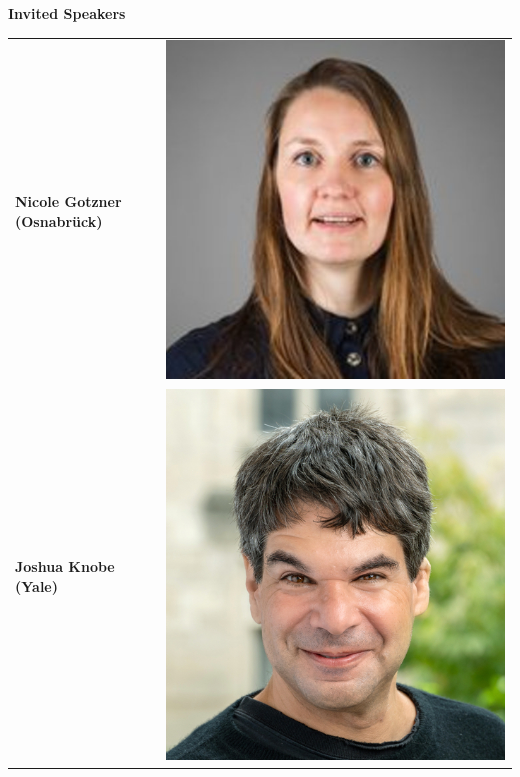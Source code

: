 \documentclass[a4paper,12pt]{article}
\begin{document}
\begin{tcolorbox}%
\begin{center}
\begin{minipage}{0.9\textwidth} %
\Large

\begin{center}
    {\huge \color{Dandelion} \textbf{Invited Speakers}}
\end{center}

\vspace{1em}
\setlength{\tabcolsep}{2pt}


\begin{tabular}{@{}>{\raggedleft\arraybackslash}m{0.3\linewidth}@{}>{\centering\arraybackslash}m{0.7\linewidth}@{}}

    \color{Blue}\textbf{Nicole Gotzner (Osnabrück)} & 
    \includegraphics[width=0.33\linewidth]{../images/nicole.png} \\[1em]
    
    \color{Blue}\textbf{Joshua Knobe (Yale)} & 
    \includegraphics[width=0.33\linewidth]{../images/joshua.jpg} \\[1em]
    

\end{tabular}
\end{minipage}
\end{center}
\end{tcolorbox}
\end{document}
